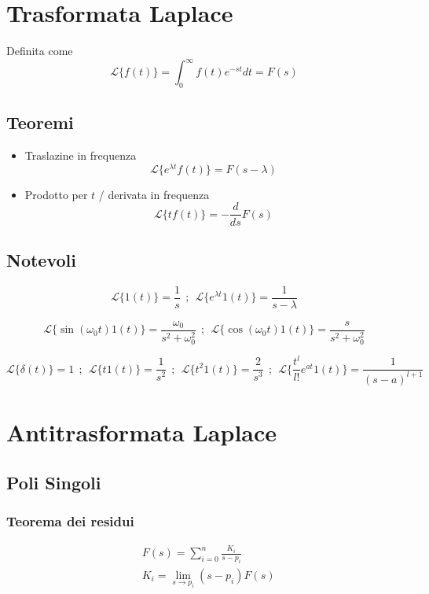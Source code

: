 \documentclass{article}
\begin{document}
\section{Trasformata Laplace}
Definita come
\[\mathcal{L}\{f(t)\} = \int_{0}^{\infty} f(t) e^{-st} dt = F(s)\]

\subsection{Teoremi}
\begin{itemize}
\item Traslazine in frequenza
  \[\mathcal{L}\{e^{\lambda t}f(t)\} = F(s-\lambda)\]
\item Prodotto per \(t\) / derivata in frequenza
  \[\mathcal{L}\{t f(t)\} = -\frac{d}{ds} F(s)\]
\end{itemize}

\subsection{Notevoli}
\[ \mathcal{L}\{1(t)\} = \frac{1}{s} \ \ ; \ \
\mathcal{L}\{e^{\lambda t} 1(t)\} = \frac{1}{s- \lambda} \]

\[ \mathcal{L}\{\sin(\omega _0 t) 1(t)\} = \frac{\omega _0}{s^2 + \omega _0 ^2}
\ \ ; \ \ \mathcal{L}\{\cos(\omega _0 t) 1(t)\} = \frac{s}{s^2 + \omega _0 ^2} \]

\[ \mathcal{L}\{\delta (t)\} = 1 \ \ ; \ \
\mathcal{L}\{t 1(t)\} = \frac{1}{s^2} \ \ ; \ \
\mathcal{L}\{t^2 1(t)\} = \frac{2}{s^3} \ \ ; \ \
\mathcal{L}\{\frac{t^l}{l!} e^{at} 1(t)\} = \frac{1}{(s-a)^{l+1}}\]


\section{Antitrasformata Laplace}

\subsection{Poli Singoli}

\subsubsection{Teorema dei residui}
\begin{align*}
  & F(s) = \sum_{i=0}^{n} \frac{K_i}{s-p_i} \\
  & K_i = \lim_{s \to p_i} (s-p_i) F(s)
\end{align*}
\end{document}
